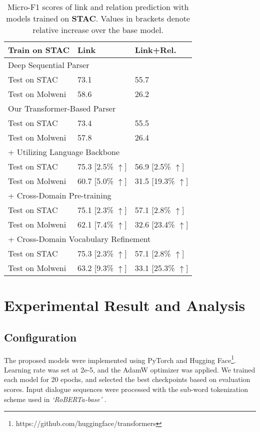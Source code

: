 \documentclass[11pt]{article}
\begin{document}
\begin{table}[t!]
\linespread{1.0}
\centering
\small
\begin{tabular}{p{2.6cm}p{1.9cm}<{\centering}p{1.9cm}<{\centering}}
\toprule
\textbf{Train on STAC}   & \textbf{Link} & \textbf{Link+Rel.} \\
\midrule
\multicolumn{3}{l}{Deep Sequential Parser \cite{shi2019deepSeqParser}} \\
Test on STAC & 73.1 & 55.7 \\
Test on Molweni & 58.6 & 26.2 \\
\midrule
\midrule
\multicolumn{3}{l}{Our Transformer-Based Parser} \\
Test on STAC & 73.4 & 55.5 \\
Test on Molweni & 57.8 & 26.4 \\
\midrule
\multicolumn{3}{l}{+ Utilizing Language Backbone} \\
Test on STAC & 75.3 [2.5\% $\uparrow$] & 56.9 [2.5\% $\uparrow$] \\
Test on Molweni & 60.7 [5.0\% $\uparrow$] & 31.5 [19.3\% $\uparrow$] \\
\midrule
\multicolumn{3}{l}{+ Cross-Domain Pre-training} \\
Test on STAC & 75.1 [2.3\% $\uparrow$] & 57.1 [2.8\% $\uparrow$] \\
Test on Molweni & 62.1 [7.4\% $\uparrow$] & 32.6 [23.4\% $\uparrow$] \\
\midrule
\multicolumn{3}{l}{+ Cross-Domain Vocabulary Refinement} \\
Test on STAC & 75.3 [2.3\% $\uparrow$] & 57.1 [2.8\% $\uparrow$] \\
Test on Molweni & 63.2 [9.3\% $\uparrow$] & 33.1 [25.3\% $\uparrow$]  \\
\bottomrule
\end{tabular}
\caption{\label{result-stac-table} Micro-F1 scores of link and relation prediction with models trained on \textbf{STAC}. Values in brackets denote relative increase over the base model.}
\vspace{-0.2cm}
\end{table}


\section{Experimental Result and Analysis}
\subsection{Configuration} 
The proposed models were implemented using PyTorch \citep{paszke2019pytorch} and Hugging Face\footnote{https://github.com/huggingface/transformers}. Learning rate was set at 2e-5, and the AdamW \cite{loshchilov2017-adamW} optimizer was applied. We trained each model for 20 epochs, and selected the best checkpoints based on evaluation scores. Input dialogue sequences were processed with the sub-word tokenization scheme used in \textit{`RoBERTa-base'} \cite{liu2019roberta}.
\end{document}
